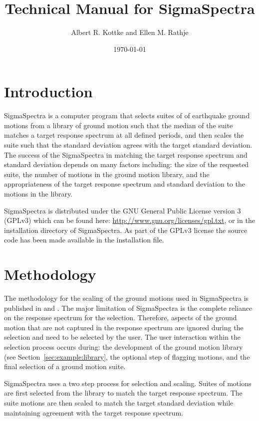 \documentclass[11pt]{article}
\title{Technical Manual for SigmaSpectra}
\author{Albert R. Kottke and Ellen M. Rathje}
\date{\today}
\begin{document}
\maketitle
\tableofcontents

\onehalfspacing

\section{Introduction}

SigmaSpectra is a computer program that selects suites of of earthquake ground
motions from a library of ground motion such that the median of the suite
matches a target response spectrum at all defined periods, and then scales the
suite such that the standard deviation agrees with the target standard
deviation. The success of the SigmaSpectra in matching the target response
spectrum and standard deviation depends on many factors including: the size of
the requested suite, the number of motions in the ground motion library, and the
appropriateness of the target response spectrum and standard deviation to the
motions in the library.

SigmaSpectra is distributed under the GNU General Public License version 3
(GPLv3) which can be found here: \url{http://www.gnu.org/licenses/gpl.txt}, or
in the installation directory of SigmaSpectra. As part of the GPLv3 license the
source code has been made available in the installation file.

\section{Methodology}\label{sec:method}

The methodology for the scaling of the ground motions used in SigmaSpectra is
published in \citet{kottke:07} and \citet{kottke:08}. The major limitation of
SigmaSpectra is the complete reliance on the response spectrum for the
selection. Therefore, aspects of the ground motion that are not captured in the
response spectrum are ignored during the selection and need to be selected by
the user. The user interaction within the selection process occurs during: the
development of the ground motion library (see Section~\ref{sec:example:library},
the optional step of flagging motions, and the final selection of a ground
motion suite.

SigmaSpectra uses a two step process for selection and scaling. Suites of
motions are first selected from the library to match the target response
spectrum. The suite motions are then scaled to match the target standard
deviation while maintaining agreement with the target response spectrum.
\end{document}
